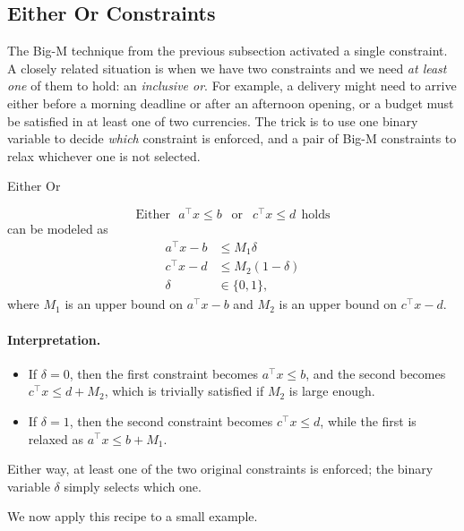 \subsection{Either Or Constraints}
\label{subsec:either-or}
The Big-M technique from the previous subsection activated a single constraint.  A closely related situation is when we have two constraints and we need \emph{at least one} of them to hold: an \emph{inclusive or}.  For example, a delivery might need to arrive either before a morning deadline or after an afternoon opening, or a budget must be satisfied in at least one of two currencies.  The trick is to use one binary variable to decide \emph{which} constraint is enforced, and a pair of Big-M constraints to relax whichever one is not selected.
\begin{general}{Either Or}{}{}

\begin{equation}
\text{Either} \ \ \ a^\top x \leq b\ \  \text{  or  } \ \  c^\top x \leq d \ \ \text{holds}
\end{equation}
can be modeled as
\begin{equation}
\begin{split}
a^\top x - b &\leq M_1 \delta\\
c^\top x - d &\leq M_2 (1-\delta)\\
\delta &\in \{0,1\},
\end{split}
\end{equation}
where $M_1$ is an upper bound on $a^\top x - b$ and $M_2$ is an upper bound on $c^\top x - d$.
\end{general}

\paragraph{Interpretation.}
\begin{itemize}
    \item If \(\delta = 0\), then the first constraint becomes \(a^\top x \leq b\), and the second becomes \(c^\top x \leq d + M_2\), which is trivially satisfied if \(M_2\) is large enough.
    \item If \(\delta = 1\), then the second constraint becomes \(c^\top x \leq d\), while the first is relaxed as \(a^\top x \leq b + M_1\).
\end{itemize}
Either way, at least one of the two original constraints is enforced; the binary variable $\delta$ simply selects which one.

We now apply this recipe to a small example.

